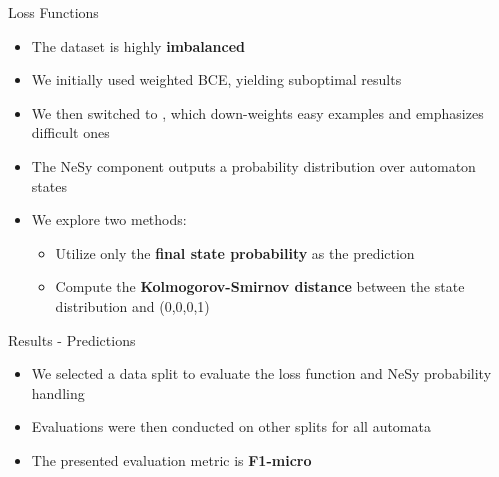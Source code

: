 \documentclass[10pt, aspectratio=169]{beamer}
\begin{document}
\begin{frame}{Loss Functions}
    \begin{itemize}
    \setlength{\itemsep}{12pt}
    \item The dataset is highly \textbf{imbalanced}
    \item We initially used weighted BCE, yielding suboptimal results
    \item We then switched to , which down-weights easy examples and emphasizes difficult ones
    \item The NeSy component outputs a \textcolor{umBlueLighter}{probability distribution} over automaton states
    \item We explore two methods:
    \vspace{5pt}
    \begin{itemize}
        \setlength{\itemsep}{3pt}
        \item Utilize only the \textbf{final state probability} as the prediction
        \item Compute the \textbf{Kolmogorov-Smirnov distance} between the state distribution and (0,0,0,1)
    \end{itemize}
    \end{itemize}
\end{frame}

\begin{frame}{Results - Predictions}
    \begin{itemize}
    \setlength{\itemsep}{13pt}
    \item We selected a data split to evaluate the loss function and NeSy probability handling
    \item Evaluations were then conducted on other splits for all automata
    \item The presented evaluation metric is \textbf{F1-micro}
    \end{itemize}
\end{frame}
\end{document}
